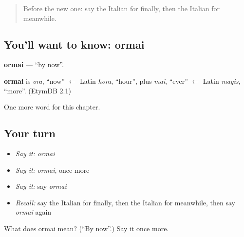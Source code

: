 \begin{quote}
Before the new one: say the Italian for finally, then the Italian for meanwhile.
\end{quote}

\subsection*{You'll want to know: ormai}
\textbf{ormai} — \textquotedblleft{}by now\textquotedblright{}.

\begin{cousinweb}
\textbf{ormai} is \emph{ora}, \textquotedblleft{}now\textquotedblright{} $\leftarrow$ Latin \emph{hora}, \textquotedblleft{}hour\textquotedblright{}, plus \emph{mai}, \textquotedblleft{}ever\textquotedblright{} $\leftarrow$ Latin \emph{magis}, \textquotedblleft{}more\textquotedblright{}. (EtymDB 2.1)
\end{cousinweb}

\begin{grammarlens}[title={What you've built}]
One more word for this chapter.
\end{grammarlens}

\subsection*{Your turn}
\begin{itemize}
\raggedright
  \item \emph{Say it:} \emph{ormai}
  \item \emph{Say it:} \emph{ormai}, once more
  \item \emph{Say it:} say \emph{ormai}
  \item \emph{Recall:} say the Italian for finally, then the Italian for meanwhile, then say \emph{ormai} again
\end{itemize}

\begin{tcolorbox}[breakable,colback=teal!4,colframe=teal!35!black,title={Before you move on}]
What does ormai mean? (\textquotedblleft{}By now\textquotedblright{}.) Say it once more.
\end{tcolorbox}
